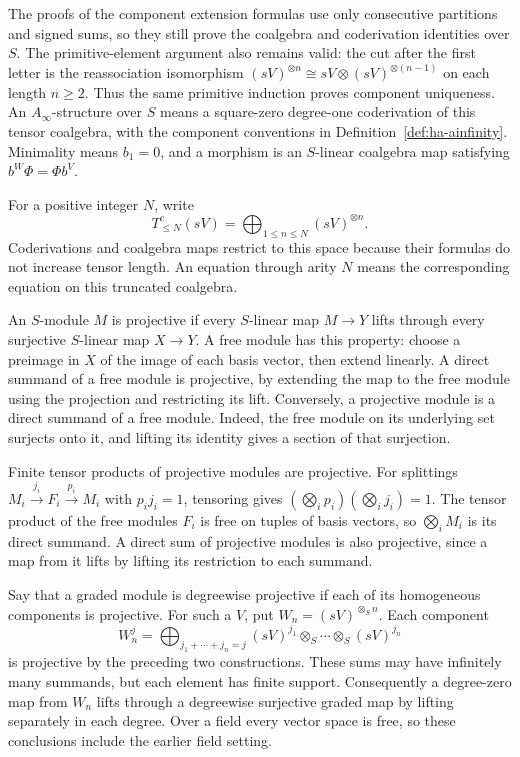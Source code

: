 The proofs of the component extension formulas use only consecutive
partitions and signed sums, so they still prove the coalgebra and
coderivation identities over $S$.
The primitive-element argument also remains valid: the cut after
the first letter is the reassociation isomorphism
$(sV)^{\otimes n}\cong sV\otimes(sV)^{\otimes(n-1)}$ on each
length $n\geq2$.
Thus the same primitive induction proves component uniqueness.
An $A_\infty$-structure over $S$ means a square-zero degree-one
coderivation of this tensor coalgebra, with the component conventions
in Definition~\ref{def:ha-ainfinity}.
Minimality means $b_1=0$, and a morphism is an $S$-linear coalgebra
map satisfying $b^W\Phi=\Phi b^V$.

For a positive integer $N$, write
\[
 T^c_{\leq N}(sV)=\bigoplus_{1\leq n\leq N}(sV)^{\otimes n}.
\]
Coderivations and coalgebra maps restrict to this space because their
formulas do not increase tensor length. An equation through arity $N$
means the corresponding equation on this truncated coalgebra.

An $S$-module $M$ is projective if every $S$-linear map $M\to Y$
lifts through every surjective $S$-linear map $X\to Y$.
A free module has this property: choose a preimage in $X$ of the
image of each basis vector, then extend linearly.
A direct summand of a free module is projective, by extending the
map to the free module using the projection and restricting its lift.
Conversely, a projective module is a direct summand of a free module.
Indeed, the free module on its underlying set surjects onto it, and
lifting its identity gives a section of that surjection.

Finite tensor products of projective modules are projective.
For splittings $M_i\xrightarrow{j_i}F_i\xrightarrow{p_i}M_i$
with $p_ij_i=1$, tensoring gives
$(\bigotimes_i p_i)(\bigotimes_i j_i)=1$.
The tensor product of the free modules $F_i$ is free on tuples of
basis vectors, so $\bigotimes_i M_i$ is its direct summand.
A direct sum of projective modules is also projective, since a map
from it lifts by lifting its restriction to each summand.

Say that a graded module is degreewise projective if each of its
homogeneous components is projective.
For such a $V$, put $W_n=(sV)^{\otimes_S n}$.
Each component
\[
 W_n^j=\bigoplus_{j_1+\cdots+j_n=j}
 (sV)^{j_1}\otimes_S\cdots\otimes_S(sV)^{j_n}
\]
is projective by the preceding two constructions.
These sums may have infinitely many summands, but each element has
finite support.
Consequently a degree-zero map from $W_n$ lifts through a degreewise
surjective graded map by lifting separately in each degree.
Over a field every vector space is free, so these conclusions include
the earlier field setting.

